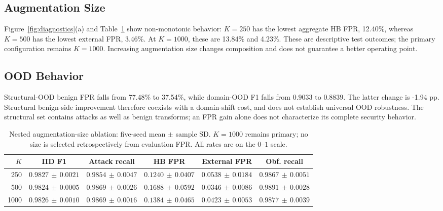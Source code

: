 \documentclass[conference]{IEEEtran}
\newcommand{\BaseDom}{0.9033}
\newcommand{\BaseStructPct}{77.48}
\newcommand{\PGHBPct}{13.84}
\newcommand{\PGExtPct}{4.23}
\newcommand{\PGDom}{0.8839}
\newcommand{\PGStructPct}{37.54}
\newcommand{\BaseDomChangePP}{-1.94}
\newcommand{\PrimaryK}{1000}
\newcommand{\KSmallHBPct}{12.40}
\newcommand{\KMediumExtPct}{3.46}
\begin{document}
\subsection{Augmentation Size}
Figure~\ref{fig:diagnostics}(a) and Table~\ref{tab:ablation} show non-monotonic behavior: $K=250$ has the lowest aggregate HB FPR, \KSmallHBPct\%, whereas $K=500$ has the lowest external FPR, \KMediumExtPct\%. At $K=\PrimaryK$, these are \PGHBPct\% and \PGExtPct\%. These are descriptive test outcomes; the primary configuration remains $K=\PrimaryK$. Increasing augmentation size changes composition and does not guarantee a better operating point.

\subsection{OOD Behavior}
Structural-OOD benign FPR falls from \BaseStructPct\% to \PGStructPct\%, while domain-OOD F1 falls from $\BaseDom$ to $\PGDom$. The latter change is \BaseDomChangePP{} pp. Structural benign-side improvement therefore coexists with a domain-shift cost, and does not establish universal OOD robustness. The structural set contains attacks as well as benign transforms; an FPR gain alone does not characterize its complete security behavior.

\begin{table}[t]
\caption{Nested augmentation-size ablation: five-seed mean $\pm$ sample SD. $K=\PrimaryK$ remains primary; no size is selected retrospectively from evaluation FPR. All rates are on the $0$--$1$ scale.}
\label{tab:ablation}
\centering\footnotesize
\setlength{\tabcolsep}{5pt}
\renewcommand{\arraystretch}{1.14}
\begin{tabular}{@{}rccccc@{}}
\toprule
$K$ & IID F1 & Attack recall & HB FPR & External FPR & Obf. recall \\
\midrule
250 & $0.9827\,\pm\,0.0021$ & $0.9854\,\pm\,0.0047$ & $0.1240\,\pm\,0.0407$ & $0.0538\,\pm\,0.0184$ & $0.9867\,\pm\,0.0051$ \\
500 & $0.9824\,\pm\,0.0005$ & $0.9869\,\pm\,0.0026$ & $0.1688\,\pm\,0.0592$ & $0.0346\,\pm\,0.0086$ & $0.9891\,\pm\,0.0028$ \\
1000 & $0.9826\,\pm\,0.0010$ & $0.9869\,\pm\,0.0016$ & $0.1384\,\pm\,0.0465$ & $0.0423\,\pm\,0.0053$ & $0.9877\,\pm\,0.0039$ \\
\bottomrule
\end{tabular}
\end{table}
\end{document}
